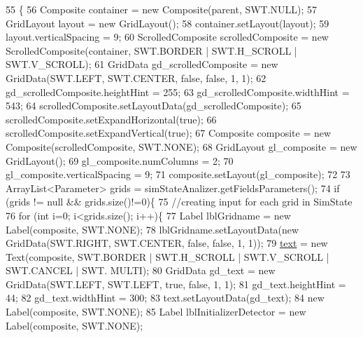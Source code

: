 \begin{DoxyCode}
55                                                 \{
56         Composite container = \textcolor{keyword}{new} Composite(parent, SWT.NULL);
57         GridLayout layout = \textcolor{keyword}{new} GridLayout();
58         container.setLayout(layout);
59         layout.verticalSpacing = 9;     
60         ScrolledComposite scrolledComposite = \textcolor{keyword}{new} ScrolledComposite(container, SWT.BORDER | SWT.H\_SCROLL | 
      SWT.V\_SCROLL);
61         GridData gd\_scrolledComposite = \textcolor{keyword}{new} GridData(SWT.LEFT, SWT.CENTER, \textcolor{keyword}{false}, \textcolor{keyword}{false}, 1, 1);
62         gd\_scrolledComposite.heightHint = 255;
63         gd\_scrolledComposite.widthHint = 543;
64         scrolledComposite.setLayoutData(gd\_scrolledComposite);
65         scrolledComposite.setExpandHorizontal(\textcolor{keyword}{true});
66         scrolledComposite.setExpandVertical(\textcolor{keyword}{true});      
67         Composite composite = \textcolor{keyword}{new} Composite(scrolledComposite, SWT.NONE);
68         GridLayout gl\_composite = \textcolor{keyword}{new} GridLayout();
69         gl\_composite.numColumns = 2;
70         gl\_composite.verticalSpacing = 9;
71         composite.setLayout(gl\_composite);
72         
73         ArrayList<Parameter> grids = simStateAnalizer.getFieldsParameters();    
74         \textcolor{keywordflow}{if} (grids != null && grids.size()!=0)\{
75             \textcolor{comment}{//creating input for each grid in SimState}
76             \textcolor{keywordflow}{for} (\textcolor{keywordtype}{int} i=0; i<grids.size(); i++)\{         
77                 Label lblGridname = \textcolor{keyword}{new} Label(composite, SWT.NONE);
78                 lblGridname.setLayoutData(\textcolor{keyword}{new} GridData(SWT.RIGHT, SWT.CENTER, \textcolor{keyword}{false}, \textcolor{keyword}{false}, 1, 1));
79                 \hyperlink{classit_1_1isislab_1_1masonassisteddocumentation_1_1mason_1_1wizards_1_1_g___grids_cell_page_a04f37a0ddf6f1114dc54a0b9b6b97c03}{text} = \textcolor{keyword}{new} Text(composite, SWT.BORDER | SWT.H\_SCROLL | SWT.V\_SCROLL | SWT.CANCEL | SWT.
      MULTI);
80                 GridData gd\_text = \textcolor{keyword}{new} GridData(SWT.LEFT, SWT.LEFT, \textcolor{keyword}{true}, \textcolor{keyword}{false}, 1, 1);
81                 gd\_text.heightHint = 44;
82                 gd\_text.widthHint = 300;
83                 text.setLayoutData(gd\_text);
84                 \textcolor{keyword}{new} Label(composite, SWT.NONE);         
85                 Label lblInitializerDetector = \textcolor{keyword}{new} Label(composite, SWT.NONE);

\end{DoxyCode}
